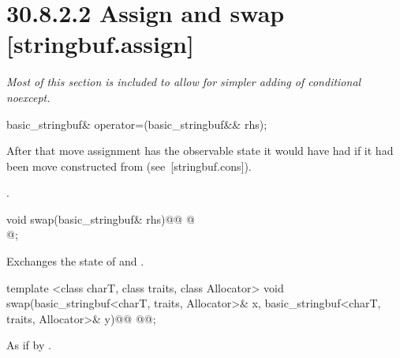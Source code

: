 \documentclass[ebook,11pt,article]{memoir}
\renewcommand{\iref}[1]{[#1]}
\begin{document}
\section{30.8.2.2 Assign and swap [stringbuf.assign]}
\textit{Most of this section is included to allow for simpler adding of conditional noexcept.}

%
\begin{itemdecl}
basic_stringbuf& operator=(basic_stringbuf&& rhs);
\end{itemdecl}

\begin{itemdescr}
\pnum
\effects {}
After that move assignment  has the observable state it would
have had if it had been move constructed from  (see~\iref{stringbuf.cons}).

\pnum
\returns {}.
\end{itemdescr}

%
\begin{itemdecl}
void swap(basic_stringbuf& rhs)@\removed{;}@
@\\
       @;
\end{itemdecl}

\begin{itemdescr}
\pnum
\effects Exchanges the state of 
and . 
\end{itemdescr}

%
\begin{itemdecl}
template <class charT, class traits, class Allocator>
  void swap(basic_stringbuf<charT, traits, Allocator>& x,
            basic_stringbuf<charT, traits, Allocator>& y)@\removed{;}@
@@;
\end{itemdecl}

\begin{itemdescr}
\pnum
\effects As if by .
\end{itemdescr}
\end{document}
